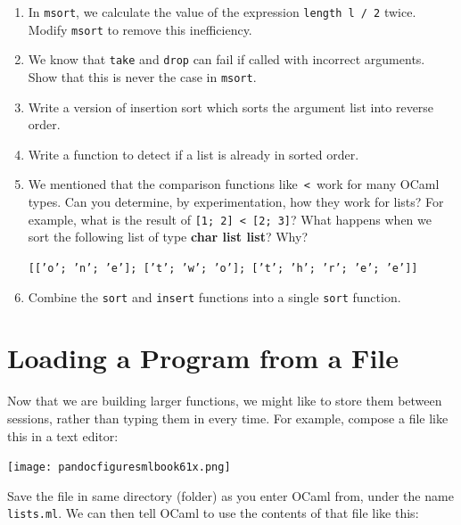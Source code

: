 \documentclass[]{book}
\begin{document}
\begin{enumerate}
  \item In \texttt{msort}, we calculate the value of the expression \texttt{length l / 2} twice. Modify \texttt{msort} to remove this inefficiency.
  \item We know that \texttt{take} and \texttt{drop} can fail if called with incorrect arguments. Show that this is never the case in \texttt{msort}.
  \item Write a version of insertion sort which sorts the argument list into reverse order.
  \item Write a function to detect if a list is already in sorted order.
  \item We mentioned that the comparison functions like \,\texttt{<}\, work for many OCaml types. Can you determine, by experimentation, how they work for lists? For example, what is the result of \texttt{[1; 2] < [2; 3]}? What happens when we sort the following list of type \textbf{\textsf{char list list}}? Why?
  
  \vspace{1mm}
  \texttt{\phantom{space}[['o'; 'n'; 'e']; ['t'; 'w'; 'o']; ['t'; 'h'; 'r'; 'e'; 'e']]}
  
  \item Combine the \texttt{sort} and \texttt{insert} functions into a single \texttt{sort} function.
\end{enumerate}

\cleardoublepage
\thispagestyle{empty}


\pagestyle{empty}


\chapter*{Loading a Program from a File}

Now that we are building larger functions, we might like to store them between sessions, rather than typing them in every time. For example, compose a file like this in a text editor:

\medskip
\begin{center}
\noindent\texttt{[image: pandocfiguresmlbook61x.png]}
\end{center}
\medskip

\noindent Save the file in same directory (folder) as you enter OCaml from, under the name \texttt{lists.ml}. We can then tell OCaml to use the contents of that file like this:
\end{document}
